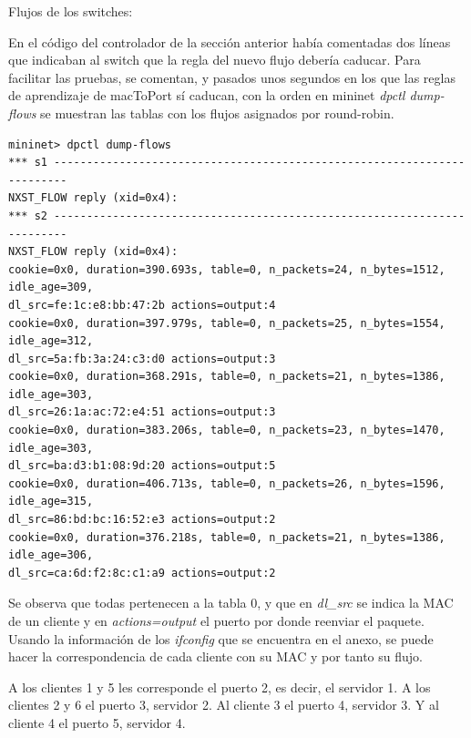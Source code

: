 \documentclass{article}
\begin{document}

\hfill

Flujos de los switches:

\hfill

En el código del controlador de la sección anterior había comentadas dos líneas que indicaban al switch que la regla del nuevo flujo debería caducar. Para facilitar las pruebas, se comentan, y pasados unos segundos en los que las reglas de aprendizaje de macToPort sí caducan, con la orden en mininet \textit{dpctl dump-flows} se muestran las tablas con los flujos asignados por round-robin.

\hfill



\begin{Verbatim}
mininet> dpctl dump-flows
*** s1 ------------------------------------------------------------------------
NXST_FLOW reply (xid=0x4):
*** s2 ------------------------------------------------------------------------
NXST_FLOW reply (xid=0x4):
cookie=0x0, duration=390.693s, table=0, n_packets=24, n_bytes=1512, idle_age=309,
dl_src=fe:1c:e8:bb:47:2b actions=output:4
cookie=0x0, duration=397.979s, table=0, n_packets=25, n_bytes=1554, idle_age=312,
dl_src=5a:fb:3a:24:c3:d0 actions=output:3
cookie=0x0, duration=368.291s, table=0, n_packets=21, n_bytes=1386, idle_age=303,
dl_src=26:1a:ac:72:e4:51 actions=output:3
cookie=0x0, duration=383.206s, table=0, n_packets=23, n_bytes=1470, idle_age=303,
dl_src=ba:d3:b1:08:9d:20 actions=output:5
cookie=0x0, duration=406.713s, table=0, n_packets=26, n_bytes=1596, idle_age=315,
dl_src=86:bd:bc:16:52:e3 actions=output:2
cookie=0x0, duration=376.218s, table=0, n_packets=21, n_bytes=1386, idle_age=306,
dl_src=ca:6d:f2:8c:c1:a9 actions=output:2
\end{Verbatim}


Se observa que todas pertenecen a la tabla 0, y que en \textit{dl\_src} se indica la MAC de un cliente y en \textit{actions=output} el puerto por donde reenviar el paquete. Usando la información de los \textit{ifconfig} que se encuentra en el anexo, se puede hacer la correspondencia de cada cliente con su MAC y por tanto su flujo.

A los clientes 1 y 5 les corresponde el puerto 2, es decir, el servidor 1. A los clientes 2 y 6 el puerto 3, servidor 2. Al cliente 3 el puerto 4, servidor 3. Y al cliente 4 el puerto 5, servidor 4.


\hfill
\end{document}

